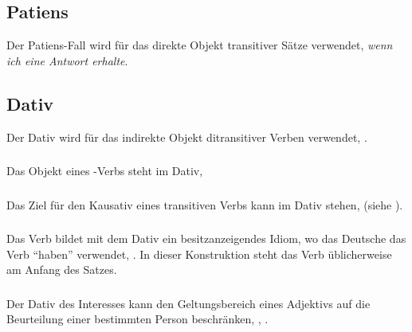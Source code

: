 \subsection{Patiens} Der Patiens-Fall wird für das direkte Objekt transitiver Sätze verwendet,  \textit{wenn ich eine Antwort erhalte}.

\subsection{Dativ} Der Dativ wird für das indirekte Objekt ditransitiver Verben verwendet,  .

\subsubsection{} Das Objekt eines -Verbs steht im Dativ,   \label{syn:case:dative-si}

\subsubsection{} Das Ziel für den Kausativ eines transitiven Verbs kann im Dativ stehen,   (siehe ). 

\subsubsection{} Das Verb  bildet mit dem Dativ ein besitzanzeigendes Idiom, wo das Deutsche das Verb ``haben'' verwendet,  . In dieser Konstruktion steht das Verb üblicherweise am Anfang des Satzes. 

\subsubsection{} Der Dativ des Interesses kann den Geltungsbereich eines Adjektivs auf die Beurteilung  einer bestimmten Person beschränken,  ,  .

